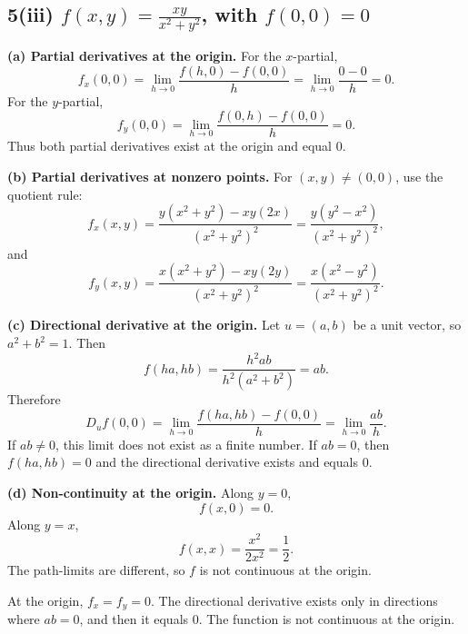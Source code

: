 \documentclass[11pt]{article}
\begin{document}
\subsection{5(iii) \(\displaystyle f(x,y)=\frac{xy}{x^2+y^2}\), with \(f(0,0)=0\)}

\textbf{(a) Partial derivatives at the origin.} For the \(x\)-partial,
\[
f_x(0,0)=\lim_{h\to0}\frac{f(h,0)-f(0,0)}{h}
=\lim_{h\to0}\frac{0-0}{h}=0.
\]
For the \(y\)-partial,
\[
f_y(0,0)=\lim_{h\to0}\frac{f(0,h)-f(0,0)}{h}=0.
\]
Thus both partial derivatives exist at the origin and equal \(0\).

\textbf{(b) Partial derivatives at nonzero points.} For \((x,y)\neq(0,0)\), use the quotient rule:
\[
f_x(x,y)=\frac{y(x^2+y^2)-xy(2x)}{(x^2+y^2)^2}
=\frac{y(y^2-x^2)}{(x^2+y^2)^2},
\]
and
\[
f_y(x,y)=\frac{x(x^2+y^2)-xy(2y)}{(x^2+y^2)^2}
=\frac{x(x^2-y^2)}{(x^2+y^2)^2}.
\]

\textbf{(c) Directional derivative at the origin.} Let \(u=(a,b)\) be a unit vector, so \(a^2+b^2=1\). Then
\[
f(ha,hb)=\frac{h^2ab}{h^2(a^2+b^2)}=ab.
\]
Therefore
\[
D_u f(0,0)=\lim_{h\to0}\frac{f(ha,hb)-f(0,0)}{h}
=\lim_{h\to0}\frac{ab}{h}.
\]
If \(ab\neq0\), this limit does not exist as a finite number. If \(ab=0\), then \(f(ha,hb)=0\) and the directional derivative exists and equals \(0\).

\textbf{(d) Non-continuity at the origin.} Along \(y=0\),
\[
f(x,0)=0.
\]
Along \(y=x\),
\[
f(x,x)=\frac{x^2}{2x^2}=\frac12.
\]
The path-limits are different, so \(f\) is not continuous at the origin.

\begin{center}
\end{center}

\begin{answerbox}
At the origin, \(f_x=f_y=0\). The directional derivative exists only in directions where \(ab=0\), and then it equals \(0\). The function is not continuous at the origin.
\end{answerbox}
\end{document}
